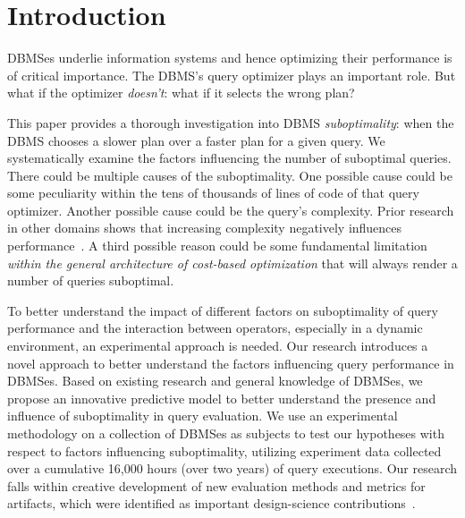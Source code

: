 \documentclass[prodmode,acmtods]{acmsmall}
\begin{document}
\section{Introduction}\label{sec:intro}
DBMSes underlie information systems and hence optimizing their performance is of
critical importance. The DBMS's query optimizer plays an important role. But
what if the optimizer {\em doesn't}: what if it selects the wrong plan?

This paper provides a thorough investigation into \hbox{DBMS} {\em
  suboptimality}: when the \hbox{DBMS} chooses a slower plan over a faster
plan for a given query. We systematically examine the factors influencing
the number of suboptimal queries. There could be multiple causes of the
suboptimality. One possible cause could be some peculiarity within the tens
of thousands of lines of code of that query optimizer. Another possible
cause could be the query's complexity. Prior research in other domains shows
that increasing complexity negatively influences
performance~\cite{campbell88,moody98}. A third possible reason could be some
fundamental limitation {\em within the general architecture of cost-based
  optimization} that will always render a number of queries suboptimal.

To better understand the impact of different factors on suboptimality of
query performance and the interaction between operators, especially in a
dynamic environment, an experimental approach is needed.
Our research introduces a novel approach
to better understand the factors influencing query performance in
\hbox{DBMSes}. Based on existing research and general knowledge of \hbox{DBMSes}, we
propose an innovative predictive model to better understand the presence and influence
of suboptimality in query evaluation. We use an experimental methodology on
a collection of \hbox{DBMSes} as subjects to test our hypotheses with respect to factors
influencing suboptimality, utilizing
experiment data collected over a \hbox{cumulative} 16,000 hours (over two
years) of query executions.
Our research falls within creative development of
new evaluation methods and metrics for artifacts, which were identified as
important design-science contributions~\cite{hevner04}.
\end{document}
